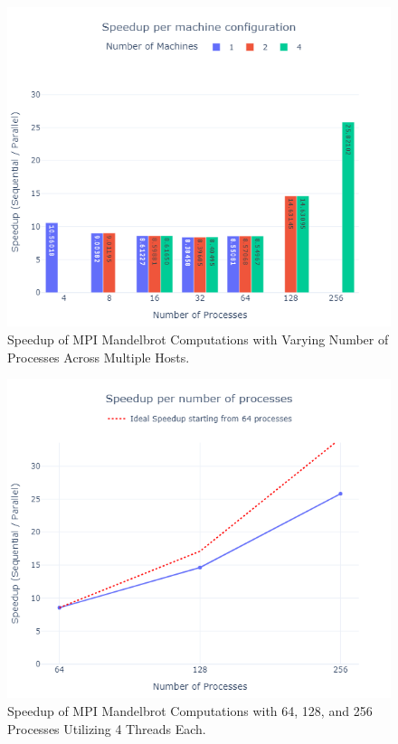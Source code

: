 \documentclass[
	report, %
	11pt, %
]{CSUniSchoolLabReport}
\begin{document}
\begin{figure}[H]
	\centering

	\captionsetup{justification=centering, width=.8\linewidth}
	\includegraphics[width=\textwidth]{./img/mandelbrot_mpi_speedup_vs_processes_bar.png}
	\caption{Speedup of MPI Mandelbrot Computations with Varying Number of Processes Across Multiple Hosts.}
	\label{fig:mandelbrot_mpi_speedup_vs_processes_bar}
\end{figure}
\begin{figure}[H]
	\centering
	\captionsetup{justification=centering, width=.8\linewidth}
	\includegraphics[width=\textwidth]{./img/mandelbrot_mpi_speedup_vs_processes.png}
	\caption{Speedup of MPI Mandelbrot Computations with 64, 128, and 256 Processes Utilizing 4 Threads Each.}
	\label{fig:mandelbrot_mpi_speedup_vs_processes}
\end{figure}
\end{document}
